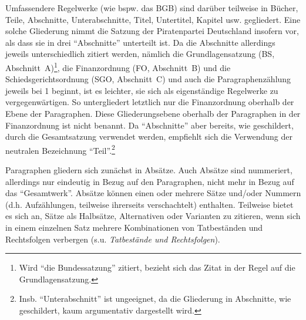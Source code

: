 Umfassendere Regelwerke (wie bspw. das BGB) sind darüber teilweise in Bücher, Teile, Abschnitte, Unterabschnitte, Titel, Untertitel, Kapitel usw. gegliedert. Eine solche Gliederung nimmt die Satzung der Piratenpartei Deutschland insofern vor, als dass sie in drei \enquote{Abschnitte} unterteilt ist. Da die Abschnitte allerdings jeweils unterschiedlich zitiert werden, nämlich die Grundlagensatzung (BS, Abschnitt~A)\footnote{Wird \enquote{die Bundessatzung} zitiert, bezieht sich das Zitat in der Regel auf die Grundlagensatzung.}, die Finanzordnung (FO, Abschnitt~B) und die Schiedsgerichtsordnung (SGO, Abschnitt~C) und auch die Paragraphenzählung jeweils bei 1 beginnt, ist es leichter, sie sich als eigenständige Regelwerke zu vergegenwärtigen. So untergliedert letztlich nur die Finanzordnung oberhalb der Ebene der Paragraphen. Diese Gliederungsebene oberhalb der Paragraphen in der Finanzordnung ist nicht benannt. Da \enquote{Abschnitte} aber bereits, wie geschildert, durch die Gesamtsatzung verwendet werden, empfiehlt sich die Verwendung der neutralen Bezeichnung \enquote{Teil}.\footnote{Insb. \enquote{Unterabschnitt} ist ungeeignet, da die Gliederung in Abschnitte, wie geschildert, kaum argumentativ dargestellt wird.}

Paragraphen gliedern sich zunächst in Absätze. Auch Absätze sind nummeriert, allerdings nur eindeutig in Bezug auf den Paragraphen, nicht mehr in Bezug auf das \enquote{Gesamtwerk}. Absätze können einen oder mehrere Sätze und/oder Nummern (d.h. Aufzählungen, teilweise ihrerseits verschachtelt) enthalten. Teilweise bietet es sich an, Sätze als Halbsätze, Alternativen oder Varianten zu zitieren, wenn sich in einem einzelnen Satz mehrere Kombinationen von Tatbeständen und Rechtsfolgen verbergen (s.u. \emph{Tatbestände und Rechtsfolgen}).

